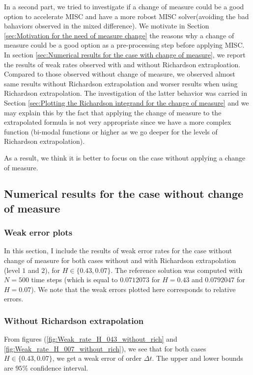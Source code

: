 \documentclass[11pt]{article}
\begin{document}
In a second part, we tried to investigate if a change of measure could be a good option to accelerate MISC and have a more robost MISC solver(avoiding the bad bahaviors observed in the mixed difference). We motivate in Section \ref{sec:Motivation for the need of measure change} the reasons why a change  of measure could be a good option as a pre-processing step before applying MISC. In section \ref{sec:Numerical results for the case with change of measure}, we report the results of weak rates observed with and without Richardson extraploation.  Compared to those observed without change of measure, we observed almost same results without Richardson extrapolation and worser results when using Richardson extrapolation. The investigation of the latter behavior was carried in Section \ref{sec:Plotting the Richardson integrand for the change of measure} and we may explain this by the fact that applying the change of measure to the extrapolated formula is not very appropriate since we have a more complex function (bi-modal functions or higher as we go deeper for the levels of Richardson extrapolation). 

As a result, we think it is better to focus on the case without applying a change of measure.



\subsection{Numerical results for the case without change of measure}
\label{sec:Numerical results for the case without change of measure}
\subsubsection{Weak error plots} \label{sec:Weak error plots_no_change}
In this section, I include the results of weak error rates for the case without change of measure for both cases without and with Richardson extrapolation (level $1$ and $2$),  for $H \in \{0.43,0.07\}$. The reference solution was computed with $N=500$ time steps (which is equal to  $0.0712073$ for $H=0.43$ and  $0.0792047$ for $H=0.07$). We note that the weak errors plotted here corresponds to relative errors.


\subsubsection*{Without Richardson extrapolation}
From figures (\ref{fig:Weak_rate_H_043_without_rich} and \ref{fig:Weak_rate_H_007_without_rich}), we see that for both cases $H \in \{0.43,0.07\}$, we get a weak error of order $\Delta t$. The upper and lower bounds are $95\%$ confidence interval.
\end{document}
